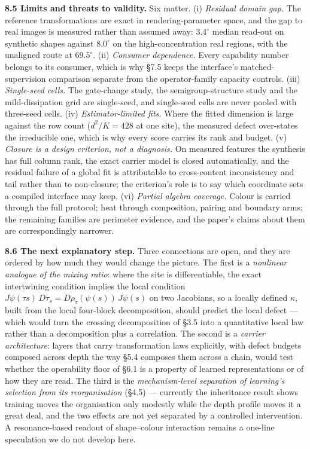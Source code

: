\textbf{8.5 Limits and threats to validity.} Six matter. (i) \textit{Residual domain gap.} The reference transformations are exact in rendering-parameter space, and the gap to real images is measured rather than assumed away: $3.4^\circ$ median read-out on synthetic shapes against $8.0^\circ$ on the high-concentration real regions, with the unaligned route at $69.5^\circ$. (ii) \textit{Consumer dependence.} Every capability number belongs to its consumer, which is why \S{}7.5 keeps the interface's matched-supervision comparison separate from the operator-family capacity controls. (iii) \textit{Single-seed cells.} The gate-change study, the semigroup-structure study and the mild-dissipation grid are single-seed, and single-seed cells are never pooled with three-seed cells. (iv) \textit{Estimator-limited fits.} Where the fitted dimension is large against the row count ($d^2/K=428$ at one site), the measured defect over-states the irreducible one, which is why every score carries its rank and budget. (v) \textit{Closure is a design criterion, not a diagnosis.} On measured features the synthesis has full column rank, the exact carrier model is closed automatically, and the residual failure of a global fit is attributable to cross-content inconsistency and tail rather than to non-closure; the criterion's role is to say which coordinate sets a compiled interface may keep. (vi) \textit{Partial algebra coverage.} Colour is carried through the full protocol; heat through composition, pairing and boundary arms; the remaining families are perimeter evidence, and the paper's claims about them are correspondingly narrower.

\textbf{8.6 The next explanatory step.} Three connections are open, and they are ordered by how much they would change the picture. The first is a \textit{nonlinear analogue of the mixing ratio}: where the site is differentiable, the exact intertwining condition implies the local condition $J\psi(\tau s)\,D\tau_s=D\rho_\tau(\psi(s))\,J\psi(s)$ on two Jacobians, so a locally defined $\kappa$, built from the local four-block decomposition, should predict the local defect --- which would turn the crossing decomposition of \S{}3.5 into a quantitative local law rather than a decomposition plus a correlation. The second is a \textit{carrier architecture}: layers that carry transformation laws explicitly, with defect budgets composed across depth the way \S{}5.4 composes them across a chain, would test whether the operability floor of \S{}6.1 is a property of learned representations or of how they are read. The third is the \textit{mechanism-level separation of learning's selection from its reorganisation} (\S{}4.5) --- currently the inheritance result shows training moves the organisation only modestly while the depth profile moves it a great deal, and the two effects are not yet separated by a controlled intervention. A resonance-based readout of shape--colour interaction remains a one-line speculation we do not develop here.
